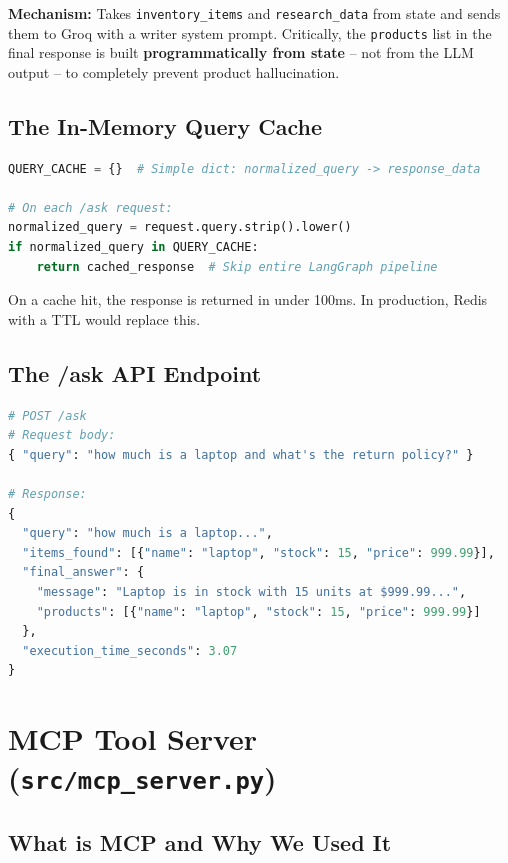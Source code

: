 \documentclass[12pt]{article}
\begin{document}
\textbf{Mechanism:} Takes \texttt{inventory\_items} and \texttt{research\_data} from state and sends them to Groq with a writer system prompt. Critically, the \texttt{products} list in the final response is built \textbf{programmatically from state} -- not from the LLM output -- to completely prevent product hallucination.

\subsection{The In-Memory Query Cache}

\begin{lstlisting}[language=Python]
QUERY_CACHE = {}  # Simple dict: normalized_query -> response_data

# On each /ask request:
normalized_query = request.query.strip().lower()
if normalized_query in QUERY_CACHE:
    return cached_response  # Skip entire LangGraph pipeline
\end{lstlisting}

On a cache hit, the response is returned in under 100ms. In production, Redis with a TTL would replace this.

\subsection{The /ask API Endpoint}

\begin{lstlisting}[language=Python]
# POST /ask
# Request body:
{ "query": "how much is a laptop and what's the return policy?" }

# Response:
{
  "query": "how much is a laptop...",
  "items_found": [{"name": "laptop", "stock": 15, "price": 999.99}],
  "final_answer": {
    "message": "Laptop is in stock with 15 units at $999.99...",
    "products": [{"name": "laptop", "stock": 15, "price": 999.99}]
  },
  "execution_time_seconds": 3.07
}
\end{lstlisting}

\section{MCP Tool Server (\texttt{src/mcp\_server.py})}

\subsection{What is MCP and Why We Used It}
\end{document}
